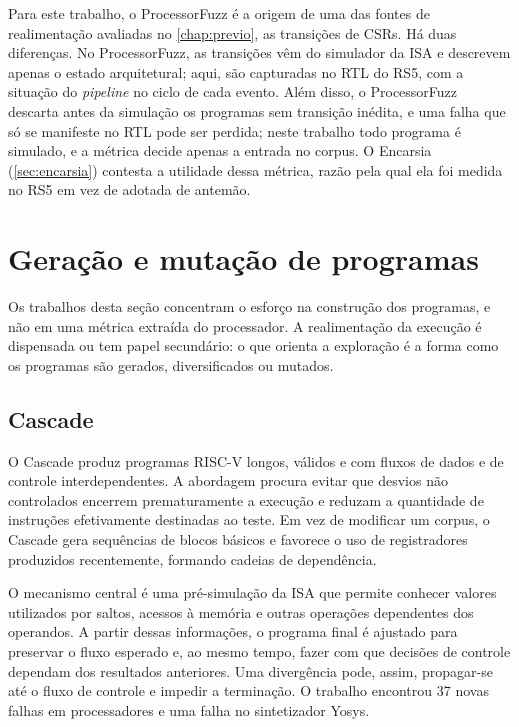 Para este trabalho, o ProcessorFuzz é a origem de uma das fontes de realimentação avaliadas no \cref{chap:previo}, as transições de CSRs. Há duas diferenças. No ProcessorFuzz, as transições vêm do simulador da ISA e descrevem apenas o estado arquitetural; aqui, são capturadas no RTL do RS5, com a situação do \textit{pipeline} no ciclo de cada evento. Além disso, o ProcessorFuzz descarta antes da simulação os programas sem transição inédita, e uma falha que só se manifeste no RTL pode ser perdida; neste trabalho todo programa é simulado, e a métrica decide apenas a entrada no corpus. O Encarsia (\cref{sec:encarsia}) contesta a utilidade dessa métrica, razão pela qual ela foi medida no RS5 em vez de adotada de antemão.

\section{Geração e mutação de programas}\label{sec:rel-geracao}

Os trabalhos desta seção concentram o esforço na construção dos programas, e não em uma métrica extraída do processador. A realimentação da execução é dispensada ou tem papel secundário: o que orienta a exploração é a forma como os programas são gerados, diversificados ou mutados.

\subsection{Cascade}\label{sec:cascade}

O Cascade \citep{Solt:2024:Cascade} produz programas RISC-V longos, válidos e com fluxos de dados e de controle interdependentes. A abordagem procura evitar que desvios não controlados encerrem prematuramente a execução e reduzam a quantidade de instruções efetivamente destinadas ao teste. Em vez de modificar um corpus, o Cascade gera sequências de blocos básicos e favorece o uso de registradores produzidos recentemente, formando cadeias de dependência.

O mecanismo central é uma pré-simulação da ISA que permite conhecer valores utilizados por saltos, acessos à memória e outras operações dependentes dos operandos. A partir dessas informações, o programa final é ajustado para preservar o fluxo esperado e, ao mesmo tempo, fazer com que decisões de controle dependam dos resultados anteriores. Uma divergência pode, assim, propagar-se até o fluxo de controle e impedir a terminação. O trabalho encontrou 37 novas falhas em processadores e uma falha no sintetizador Yosys.


